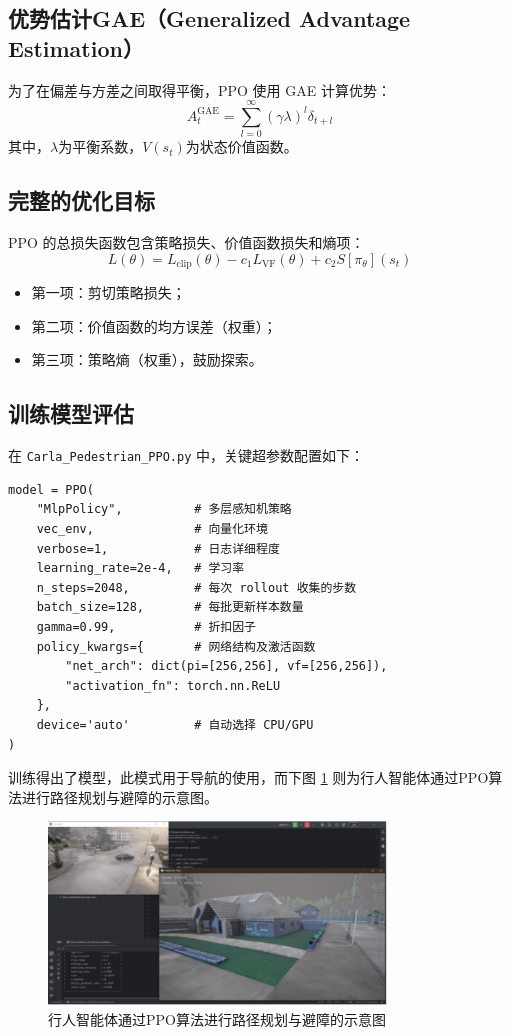 \subsection{优势估计GAE（Generalized Advantage Estimation）}
为了在偏差与方差之间取得平衡，PPO 使用 GAE 计算优势：
\[
A_t^{\text{GAE}} = \sum_{l=0}^{\infty} (\gamma \lambda)^l \delta_{t+l}
\]
其中，$\lambda$为平衡系数，$V(s_t)$为状态价值函数。

\subsection{完整的优化目标}
PPO 的总损失函数包含策略损失、价值函数损失和熵项：
\[
L(\theta) = L_{\text{clip}}(\theta) - c_1 L_{\text{VF}}(\theta) + c_2 S[\pi_{\theta}](s_t)
\]
\begin{itemize}
    \item 第一项：剪切策略损失；
    \item 第二项：价值函数的均方误差（权重）；
    \item 第三项：策略熵（权重），鼓励探索。
\end{itemize}

\subsection{训练模型评估}
在 \texttt{Carla\_Pedestrian\_PPO.py} 中，关键超参数配置如下：
\begin{verbatim}
model = PPO(
    "MlpPolicy",          # 多层感知机策略
    vec_env,              # 向量化环境
    verbose=1,            # 日志详细程度
    learning_rate=2e-4,   # 学习率
    n_steps=2048,         # 每次 rollout 收集的步数
    batch_size=128,       # 每批更新样本数量
    gamma=0.99,           # 折扣因子
    policy_kwargs={       # 网络结构及激活函数
        "net_arch": dict(pi=[256,256], vf=[256,256]),
        "activation_fn": torch.nn.ReLU
    },
    device='auto'         # 自动选择 CPU/GPU
)
\end{verbatim}

训练得出了模型，此模式用于导航的使用，而下图 \ref{fig:path_planning} 则为行人智能体通过PPO算法进行路径规划与避障的示意图。

\begin{figure}[H]
    \centering
    \includegraphics[width=0.8\textwidth]{images/path_planning.pdf}
    \caption{行人智能体通过PPO算法进行路径规划与避障的示意图}
    \label{fig:path_planning}
\end{figure}

